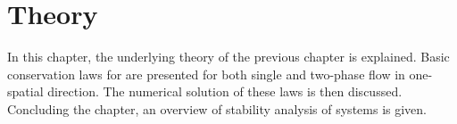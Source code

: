 \chapter{Theory}\label{Chapter:Theory}

In this chapter, the underlying theory of the previous chapter is explained.
Basic conservation laws for \TH are presented for both single and two-phase flow in one-spatial direction.
The numerical solution of these laws is then discussed.
Concluding the chapter, an overview of stability analysis of systems is given.



